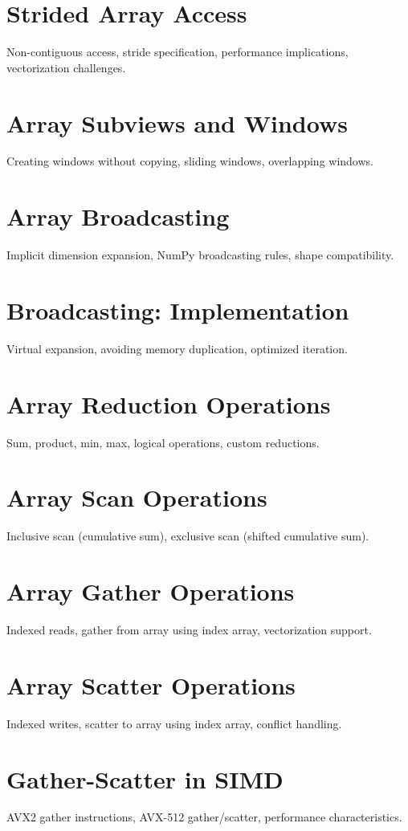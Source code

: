 \chapter{Strided Array Access}
Non-contiguous access, stride specification, performance implications, vectorization challenges.

\chapter{Array Subviews and Windows}
Creating windows without copying, sliding windows, overlapping windows.

\chapter{Array Broadcasting}
Implicit dimension expansion, NumPy broadcasting rules, shape compatibility.

\chapter{Broadcasting: Implementation}
Virtual expansion, avoiding memory duplication, optimized iteration.

\chapter{Array Reduction Operations}
Sum, product, min, max, logical operations, custom reductions.

\chapter{Array Scan Operations}
Inclusive scan (cumulative sum), exclusive scan (shifted cumulative sum).

\chapter{Array Gather Operations}
Indexed reads, gather from array using index array, vectorization support.

\chapter{Array Scatter Operations}
Indexed writes, scatter to array using index array, conflict handling.

\chapter{Gather-Scatter in SIMD}
AVX2 gather instructions, AVX-512 gather/scatter, performance characteristics.

